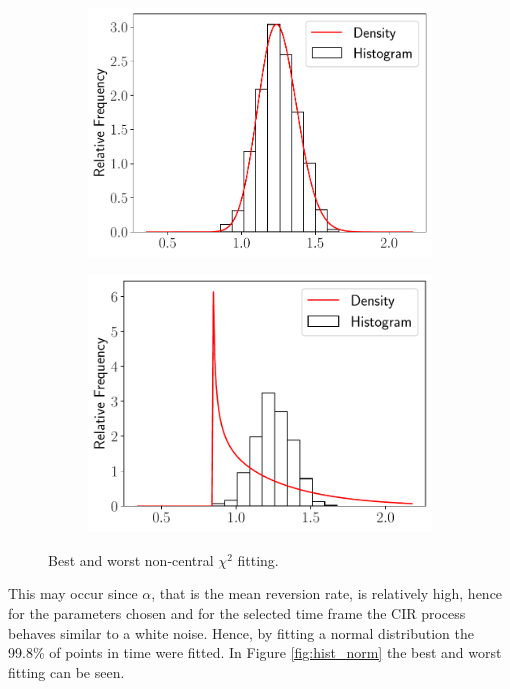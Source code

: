 \documentclass[11pt]{article}
\theoremstyle{definition}
\theoremstyle{remark}
\theoremstyle{remark}
\begin{document}
\begin{figure}[H]
  \centering
  \begin{subfigure}[b]{0.45\textwidth}
    \centering
    \includegraphics[scale=.45]{maxp_ncx2_histogram_eachT}
  \end{subfigure}
    \begin{subfigure}[b]{0.45\textwidth}
    \centering
    \includegraphics[scale=.45]{minp_ncx2_histogram_eachT}
  \end{subfigure}
  \caption{Best and worst non-central $\chi^2$ fitting.}
  \label{fig:hist_chi2}
\end{figure}

This may occur since $\alpha$, that is the mean reversion rate, is relatively
high, hence for the parameters chosen and for the selected time frame the CIR
process behaves similar to a white noise. Hence, by fitting a normal distribution
the 99.8\% of points in time were fitted. In Figure \ref{fig:hist_norm}
the best and worst fitting can be seen.
\end{document}
